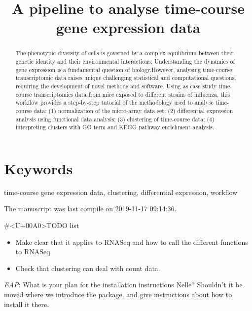 \documentclass[9pt,a4paper,]{extarticle}
\begin{document}
\pagestyle{front}

\title{A pipeline to analyse time-course gene expression data}


\maketitle
\thispagestyle{front}

\begin{abstract}
The phenotypic diversity of cells is governed by a complex equilibrium between their genetic identity and their environmental interactions: Understanding the dynamics of gene expression is a fundamental question of biology.However, analysing time-course transcriptomic data raises unique challenging statistical and computational questions, requiring the development of novel methods and software. Using as case study time-course transcriptomics data from mice exposed to different strains of influenza, this workflow provides a step-by-step tutorial of the methodology used to analyse time-course data: (1) normalization of the micro-array data set; (2) differential expression analysis using functional data analysis; (3) clustering of time-course data; (4) interpreting clusters with GO term and KEGG pathway enrichment analysis.
\end{abstract}

\section*{Keywords}
time-course gene expression data, clustering, differential expression, workflow


\clearpage
\pagestyle{main}

The manuscript was last compile on 2019-11-17 09:14:36.

\#\textless{}U+00A0\textgreater{}TODO list

\begin{itemize}
\tightlist
\item
  Make clear that it applies to RNASeq and how to call the different functions
  to RNASeq
\item
  Check that clustering can deal with count data.
\end{itemize}

\emph{EAP}: What is your plan for the installation instructions Nelle? Shouldn't it be moved where we introduce the package, and give instructions about how to install it there.
\end{document}
